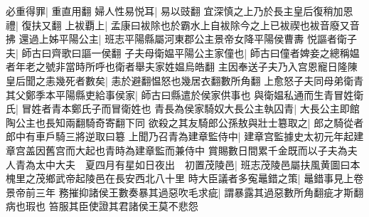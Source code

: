 必重得罪|{
	重直用翻}
婦人性易悦耳|{
	易以豉翻}
宜深慎之上乃於長主皇后復稍加恩禮|{
	復扶又翻}
上袚覇上|{
	孟康曰袚除也於霸水上自袚除今之上已袚禊也袚音廢又音拂}
還過上姊平陽公主|{
	班志平陽縣屬河東郡公主景帝女降平陽侯曹夀}
悦謳者衛子夫|{
	師古曰齊歌曰謳一侯翻}
子夫母衛媪平陽公主家僮也|{
	師古曰僮者婢妾之總稱媪者年老之號非當時所呼也衛者舉夫家姓媪烏皓翻}
主因奉送子夫乃入宫恩寵日隆陳皇后聞之恚幾死者數矣|{
	恚於避翻愠怒也幾居衣翻數所角翻}
上愈怒子夫同母弟衛青其父鄭季本平陽縣吏給事侯家|{
	師古曰縣遣於侯家供事也}
與衛媪私通而生青冒姓衛氏|{
	冒姓者青本鄭氏子而冒衛姓也}
青長為侯家騎奴大長公主執囚青|{
	大長公主即館陶公主也長知兩翻騎奇寄翻下同}
欲殺之其友騎郎公孫敖與壯士簒取之|{
	郎之騎從者郎中有車戶騎三將逆取曰簒}
上聞乃召青為建章監侍中|{
	建章宫監據史太初元年起建章宫盖因舊宫而大起也青時為建章監而兼侍中}
賞賜數日間累千金既而以子夫為夫人青為太中大夫　夏四月有星如日夜出　初置茂陵邑|{
	班志茂陵邑屬扶風黄圖曰本槐里之茂鄉武帝起陵邑在長安西北八十里}
時大臣議者多寃鼂錯之策|{
	鼂錯事見上卷景帝前三年}
務摧抑諸侯王數奏暴其過惡吹毛求疵|{
	謂暴露其過惡數所角翻疵才斯翻病也瑕也}
笞服其臣使證其君諸侯王莫不悲怨

